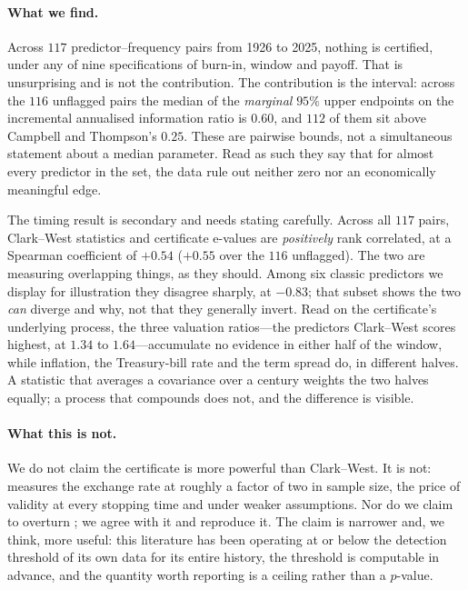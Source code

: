 \documentclass{article}
\theoremstyle{plain}
\theoremstyle{definition}
\begin{document}
\paragraph{What we find.} Across $117$ predictor--frequency pairs from 1926 to 2025, nothing
is certified, under any of nine specifications of burn-in, window and payoff. That is
unsurprising and is not the contribution. The contribution is the interval: across the $116$
unflagged pairs the median of the \emph{marginal} $95\%$ upper endpoints on the incremental
annualised information ratio is $0.60$, and $112$ of them sit above Campbell and Thompson's
$0.25$. These are pairwise bounds, not a simultaneous statement about a median parameter. Read
as such they say that for almost every predictor in the set, the data rule out neither zero nor
an economically meaningful edge.

The timing result is secondary and needs stating carefully. Across all $117$ pairs, Clark--West
statistics and certificate e-values are \emph{positively} rank correlated, at a Spearman
coefficient of $+0.54$ ($+0.55$ over the $116$ unflagged). The two are measuring overlapping
things, as they should. Among six classic predictors we display for illustration they disagree
sharply, at $-0.83$; that subset shows the two \emph{can} diverge and why, not that they
generally invert. Read on the certificate's underlying process, the three valuation ratios---the
predictors Clark--West scores highest, at $1.34$ to $1.64$---accumulate no evidence in either
half of the window, while inflation, the Treasury-bill rate and the term spread do, in different
halves. A statistic that averages a covariance over a century weights the two halves equally; a
process that compounds does not, and the difference is visible.

\paragraph{What this is not.} We do not claim the certificate is more powerful than
Clark--West. It is not: \citet{guven2026} measures the exchange rate at roughly a factor of two
in sample size, the price of validity at every stopping time and under weaker assumptions. Nor
do we claim to overturn \citet{welch2008}; we agree with it and reproduce it. The claim is
narrower and, we think, more useful: this literature has been operating at or below the
detection threshold of its own data for its entire history, the threshold is computable in
advance, and the quantity worth reporting is a ceiling rather than a $p$-value.
\end{document}
